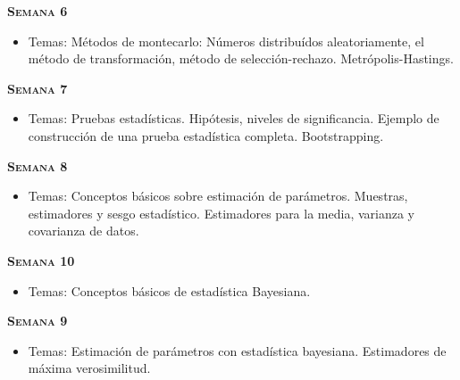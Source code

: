 \documentclass[letterpaper,10pt,onecolumn]{article}
\begin{document}
\noindent\textbf{\textsc{Semana 6}}\\[-0.5cm]
\begin{itemize}
\item Temas:  M\'etodos de montecarlo: N\'umeros distribu\'idos
  aleatoriamente, el m\'etodo de transformaci\'on, m\'etodo de
  selecci\'on-rechazo. Metr\'opolis-Hastings. \\[-0.6cm] 
\end{itemize}


\noindent\textbf{\textsc{Semana 7}}\\[-0.5cm]
\begin{itemize}
\item Temas: Pruebas estad\'isticas. Hip\'otesis, niveles de
  significancia. Ejemplo de construcci\'on de una prueba estad\'istica
  completa. Bootstrapping. \\[-0.6cm] 
\end{itemize}

\noindent\textbf{\textsc{Semana 8}}\\[-0.5cm]
\begin{itemize}
\item Temas: Conceptos b\'asicos sobre estimaci\'on de
  par\'ametros. Muestras, estimadores y sesgo
  estad\'istico. Estimadores para la media, varianza y covarianza de
  datos. \\[-0.6cm] 
\end{itemize}

\noindent\textbf{\textsc{Semana 10}}\\[-0.5cm]
\begin{itemize}
\item Temas: Conceptos b\'asicos de estad\'istica
  Bayesiana. 
\\[-0.6cm]   
\end{itemize}


\noindent\textbf{\textsc{Semana 9}}\\[-0.5cm]
\begin{itemize}
\item Temas: 
Estimaci\'on de par\'ametros con estad\'istica
  bayesiana.  Estimadores de m\'axima verosimilitud. 
\\[-0.6cm] 
\\[-0.6cm]
\end{itemize}
\end{document}
